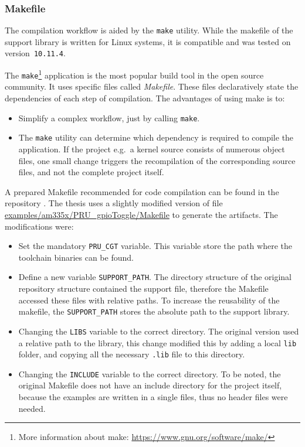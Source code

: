 \subsubsection{Makefile}

The compilation workflow is aided by the \verb+make+ utility. While the makefile of the support library is written for Linux systems, it is compatible and was tested on \osx{} version~\verb|10.11.4|.

The \verb+make+\footnote{More information about make: \url{https://www.gnu.org/software/make/}} application is the most popular build tool in the open source community. It uses specific files called \emph{Makefile}. These files declaratively state the dependencies of each step of compilation. The advantages of using make is to:
\begin{itemize}
	\item Simplify a complex workflow, just by calling \verb+make+.
	\item The \verb+make+ utility can determine which dependency is required to compile the application. If the project e.g.\ a kernel source consists of numerous object files, one small change triggers the recompilation of the corresponding source files, and not the complete project itself.
\end{itemize}

A prepared Makefile recommended for \pru{} code compilation can be found in the repository \citep{TI_PRUSS_REPO}. The thesis uses a slightly modified version of file \url{examples/am335x/PRU_gpioToggle/Makefile} to generate the artifacts. The modifications were:
\begin{itemize}
	\item Set the mandatory \verb+PRU_CGT+ variable. This variable store the path where the toolchain binaries can be found.
	\item Define a new variable \verb+SUPPORT_PATH+. The directory structure of the original repository structure contained the support file, therefore the Makefile accessed these files with relative paths. To increase the reusability of the makefile, the \verb+SUPPORT_PATH+ stores the absolute path to the support library.
	\item Changing the \verb+LIBS+ variable to the correct directory. The original version used a relative path to the library, this change modified this by adding a local \verb+lib+ folder, and copying all the necessary \verb+.lib+ file to this directory.
	\item Changing the \verb+INCLUDE+ variable to the correct directory. To be noted, the original Makefile does not have an include directory for the project itself, because the examples are written in a single files, thus no header files were needed.
\end{itemize}

